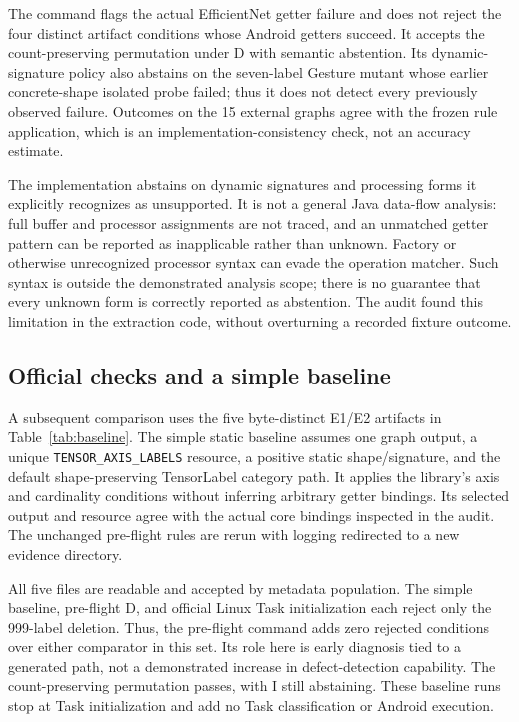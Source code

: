\documentclass[10pt,twocolumn,letterpaper]{article}
\newcommand{\code}[1]{\texttt{#1}}
\begin{document}
The command flags the actual EfficientNet getter failure and does not reject the four distinct artifact conditions whose Android getters succeed. It accepts the count-preserving permutation under D with semantic abstention. Its dynamic-signature policy also abstains on the seven-label Gesture mutant whose earlier concrete-shape isolated probe failed; thus it does not detect every previously observed failure. Outcomes on the 15 external graphs agree with the frozen rule application, which is an implementation-consistency check, not an accuracy estimate.

The implementation abstains on dynamic signatures and processing forms it explicitly recognizes as unsupported. It is not a general Java data-flow analysis: full buffer and processor assignments are not traced, and an unmatched getter pattern can be reported as inapplicable rather than unknown. Factory or otherwise unrecognized processor syntax can evade the operation matcher. Such syntax is outside the demonstrated analysis scope; there is no guarantee that every unknown form is correctly reported as abstention. The audit found this limitation in the extraction code, without overturning a recorded fixture outcome.

\subsection{Official checks and a simple baseline}
A subsequent comparison uses the five byte-distinct E1/E2 artifacts in Table~\ref{tab:baseline}. The simple static baseline assumes one graph output, a unique \code{TENSOR\_AXIS\_LABELS} resource, a positive static shape/signature, and the default shape-preserving TensorLabel category path. It applies the library's axis and cardinality conditions without inferring arbitrary getter bindings. Its selected output and resource agree with the actual core bindings inspected in the audit. The unchanged pre-flight rules are rerun with logging redirected to a new evidence directory.

All five files are readable and accepted by metadata population. The simple baseline, pre-flight D, and official Linux Task initialization each reject only the 999-label deletion. Thus, the pre-flight command adds zero rejected conditions over either comparator in this set. Its role here is early diagnosis tied to a generated path, not a demonstrated increase in defect-detection capability. The count-preserving permutation passes, with I still abstaining. These baseline runs stop at Task initialization and add no Task classification or Android execution.
\end{document}
